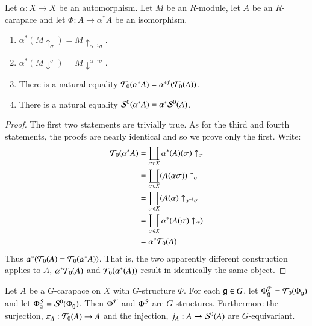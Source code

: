 \begin{lemma}\label{art6-lemma-8.10}
Let $\alpha : X \rightarrow X$ be an automorphism. Let $M$ be an $R$-module, let $A$ be an $R$-carapace and let $\Phi : A
\rightarrow \alpha^{*} A$ be an isomorphism.
    \begin{enumerate}[(1)]
        \item $\alpha^{*}(M \uparrow_{\sigma}) = M \uparrow_{\alpha^{-1}\sigma}$.\label{art6-lemma8.10-enmu-1}
        \item $\alpha^{*}(M \downarrow^{\sigma}) = M\downarrow^{\alpha^{-1}\sigma}$.\label{art6-lemma8.10-enmu-2}
        \item There is a natural equality $\mathcal{T}_{0}(\alpha^{*}A) = \alpha^{*f}(\mathcal{T}_{0}(A))$.\label{art6-lemma8.10-enmu-3}
        \item There is a natural equality $\mathcal{S}^{0}(\alpha^{*} A) = \alpha^{*}\mathcal{S}^{0}(A)$.\label{art6-lemma8.10-enmu-4}
    \end{enumerate} 
\end{lemma}

\begin{proof}
The first two statements are trivially true. As for the third and fourth statements, the proofs are nearly identical and so we prove only the first. Write:
\begin{align*}
\mathcal{T}_{0}(\alpha^{*}A) &= \coprod_{\sigma \in X} \alpha^{*}(A)(\sigma )\uparrow_{\sigma}\\
& = \coprod_{\sigma \in X}(A(\alpha \sigma ))\uparrow_{\sigma}\\
& = \coprod_{\sigma \in X}(A(\alpha)\uparrow_{\alpha^{-1}\sigma}\\
& = \coprod_{\sigma \in X} \alpha^{*}(A(\sigma)\uparrow_{\sigma})\\
& = \alpha^{*}\mathcal{T}_{0}(A)
\end{align*}
Thus $\alpha^{*}(\mathcal{T}_{0}(A) = \mathcal{T}_{0}(\alpha^{*}A))$. That is, the two apparently different construction applies to $A$, $\alpha^{*}\mathcal{T}_{0}(A)$ and $\mathcal{T}_{0}(\alpha^{*}(A))$ result in identically the same object.
\end{proof}

\begin{prop}\label{art6-proposition-8.11}
Let $A$ be a $G$-carapace on $X$ with $G$-structure $\Phi$. For each $\mathsf{g} \in G$, let $\Phi_{\mathsf{g}}^{\mathcal{T}} = \mathcal{T}_{0}(\Phi_{\mathsf{g}})$ and let $\Phi_{\mathsf{g}}^{\mathcal{S}} = \mathcal{S}^{0}(\Phi_{\mathsf{g}})$. Then $\Phi^{\mathcal{T}}$ and $\Phi^{\mathcal{S}}$ are $G$-structures. Furthermore the surjection, $\pi_{A} : \mathcal{T}_{0}(A)\rightarrow A$ and the injection, $j_{A}: A \rightarrow \mathcal{S}^{0}(A)$ are $G$-equivariant.
\end{prop}

